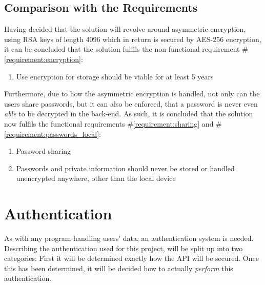 		\subsection{Comparison with the Requirements}
			\label{requirement:fulfilled:sharing}
			\label{requirement:fulfilled:passwords_local}
			\label{requirement:fulfilled:encryption}
			Having decided that the solution will revolve around asymmetric encryption, using RSA keys of length 4096 which in return is secured by AES-256 encryption, it can be concluded that the solution fulfils the non-functional requirement \#\ref{requirement:encryption}:

			\vspace{-3ex}\begin{enumerate}
				\setlength\itemsep{0.1em}
				\setcounter{enumi}{4-1}
				\item Use encryption for storage should be viable for at least 5 years
			\end{enumerate}

			Furthermore, due to how the asymmetric encryption is handled, not only can the users share passwords, but it can also be enforced, that a password is never even \emph{able} to be decrypted in the back-end. As such, it is concluded that the solution now fulfils the functional requirements \#\ref{requirement:sharing} and \#\ref{requirement:passwords_local}:
			\vspace{-3ex}\begin{enumerate}
				\setlength\itemsep{0.1em}
				\setcounter{enumi}{5-1}
				\item Password sharing
				\setcounter{enumi}{9-1}
				\item Passwords and private information should never be stored or handled unencrypted anywhere, other than the local device
			\end{enumerate}




	\section{Authentication}
		\label{sec:design:authentication}
		As with any program handling users' data, an authentication system is needed. Describing the authentication used for this project, will be split up into two categories: First it will be determined exactly how the API will be secured. Once this has been determined, it will be decided how to actually \emph{perform} this authentication.

